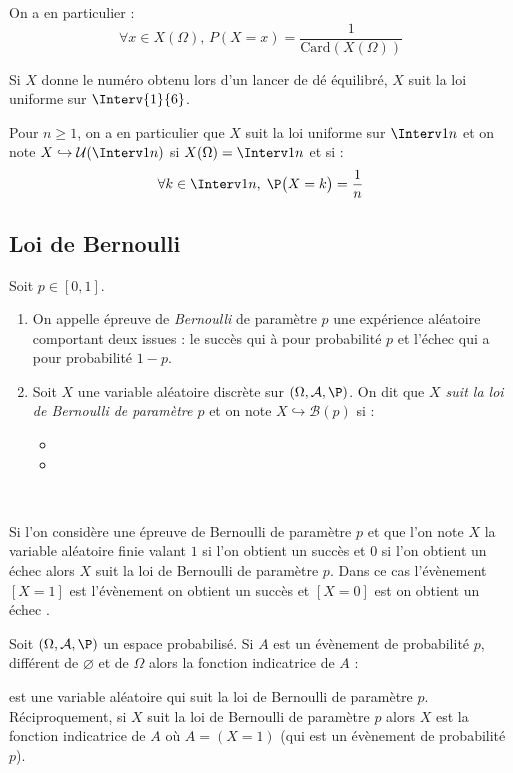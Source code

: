\documentclass[a4paper,10pt]{report}
\begin{document}
\begin{exems}
\item On a en particulier :
$$ \forall x \in X(\Omega), \, P(X=x) = \dfrac{1}{\textrm{Card}(X(\Omega))}$$
\item Si $X$ donne le numéro obtenu lors d'un lancer de dé équilibré, $X$ suit la loi uniforme sur $\Interv{1}{6}$.
\item Pour $n \geq 1$, on a en particulier que $X$ suit la loi uniforme sur $\Interv 1n$ et on note $X \hookrightarrow \mathcal{U}(\Interv 1n)$ si $X(\Omega)= \Interv 1n$ et si :
 $$ \forall k \in \Interv 1n,\; \P\big(X=k\big)=  \frac 1n $$
\end{exems}
\subsection{Loi de Bernoulli}
\begin{defin}
Soit $p \in [0,1]$.
\begin{enumerate}
\item On appelle épreuve de \textit{Bernoulli} de paramètre $p$ une expérience aléatoire comportant deux issues : le succès qui à pour probabilité $p$ et l'échec qui a pour probabilité $1-p$.
\item Soit $X$ une variable aléatoire discrète sur $(\Omega, \mathcal{A},\P)$. On dit que \textit{$X$ suit la loi de Bernoulli de paramètre $p$} et on note $X \hookrightarrow \mathcal{B}(p)$ si :
\begin{itemize}
 \item {}
 \item \phantom{$ \P\big(X=1\big)= p$ et $\P\big(X=0\big)=1-p$.}
\end{itemize}
$\phantom{}$
\end{enumerate}
\end{defin}

\noindent Si l'on considère une épreuve de Bernoulli de paramètre $p$ et que l'on note $X$ la variable aléatoire finie valant $1$ si l'on obtient un succès et $0$ si l'on obtient un échec alors $X$ suit la loi de Bernoulli de paramètre $p$. Dans ce cas l'évènement $[X=1]$ est l'évènement \og on obtient un succès \fg et $[X=0]$ est \og on obtient un échec \fg .

\begin{rem} Soit $(\Omega, \mathcal{A}, \P)$ un espace probabilisé. Si $A$ est un évènement de probabilité $p$, différent de $\varnothing$ et de $\Omega$ alors la fonction indicatrice de $A$ :

\vspace{2cm}

est une variable aléatoire qui suit la loi de Bernoulli de paramètre $p$. Réciproquement, si $X$ suit la loi de Bernoulli de paramètre $p$ alors $X$ est la fonction indicatrice de $A$ où $A=(X=1)$ (qui est un évènement de probabilité $p$).
\end{rem}
\end{document}
